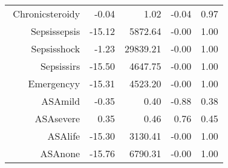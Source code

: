 \begin{tabular}{rrrrr}
$$  Chronic\-steroid\-y & -0.04 & 1.02 & -0.04 & 0.97 \\ 
  Sepsis\-sepsis & -15.12 & 5872.64 & -0.00 & 1.00 \\ 
  Sepsis\-shock & -1.23 & 29839.21 & -0.00 & 1.00 \\ 
  Sepsis\-sirs & -15.50 & 4647.75 & -0.00 & 1.00 \\ 
  Emergency\-y & -15.31 & 4523.20 & -0.00 & 1.00 \\ 
  ASA\-mild & -0.35 & 0.40 & -0.88 & 0.38 \\ 
  ASA\-severe & 0.35 & 0.46 & 0.76 & 0.45 \\ 
  ASA\-life & -15.30 & 3130.41 & -0.00 & 1.00 \\ 
  ASA\-none & -15.76 & 6790.31 & -0.00 & 1.00 \\ 
   \hline
\end{tabular}

